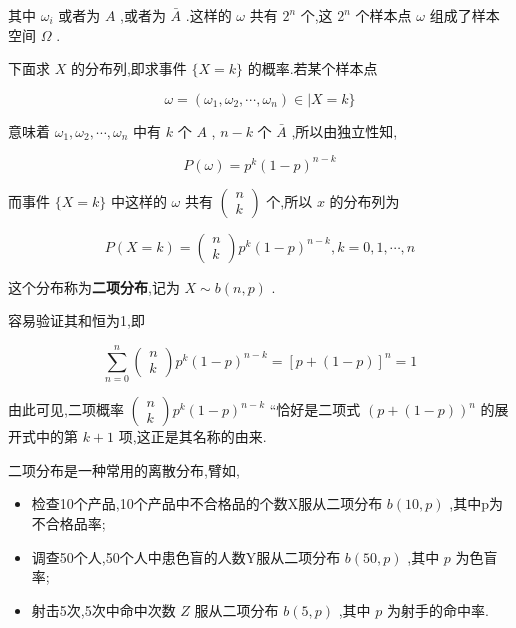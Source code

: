 其中 $ \omega_{i} $ 或者为 $ A $ ,或者为 $ \bar{A} $ .这样的 $ \omega $ 共有 $ 2^{n} $ 个,这 $ 2^{n} $ 个样本点 $ \omega $ 组成了样本空间 $ \Omega $ .

下面求 $ X $ 的分布列,即求事件 $ \{X=k\} $ 的概率.若某个样本点

\[
\omega=\left(\omega_{1}, \omega_{2}, \cdots, \omega_{n}\right) \in | X=k \}
\]

意味着 $ \omega_{1}, \omega_{2}, \cdots, \omega_{n} $ 中有 $ k $ 个 $ A $ , $ n-k $ 个 $ \bar{A} $ ,所以由独立性知,

\[
P(\omega)=p^{k}(1-p)^{n-k}
\]

而事件 $ \{X=k\} $ 中这样的 $ \omega $ 共有 $ \left( \begin{array}{l}{n} \\ {k}\end{array}\right) $ 个,所以 $ x $ 的分布列为

\begin{equation}
P(X=k)=\left( \begin{array}{l}{n} \\ {k}\end{array}\right) p^{k}(1-p)^{n-k}, k=0,1, \cdots, n \label{eq:2.4.1}
\end{equation}


这个分布称为\textbf{二项分布},记为 $ X \sim b(n, p) $ .

容易验证其和恒为1,即

\[
\sum_{n=0}^{n} \left( \begin{array}{l}{n} \\ {k}\end{array}\right) p^{k}(1-p)^{n-k}=[p+(1-p)]^{n}=1
\]

由此可见,二项概率 $ \left( \begin{array}{l}{n} \\ {k}\end{array}\right) p^{k}(1-p)^{n-k} $ “恰好是二项式 $ (p+(1-p))^{n} $ 的展开式中的第 $ k+1 $ 项,这正是其名称的由来.

二项分布是一种常用的离散分布,臂如,

\begin{itemize}
	\item 检查10个产品,10个产品中不合格品的个数X服从二项分布 $ b(10,p) $ ,其中p为不合格品率;
	\item 调查50个人,50个人中患色盲的人数Y服从二项分布 $ b(50,p) $ ,其中 $ p $ 为色盲率;
	\item 射击5次,5次中命中次数 $ Z $ 服从二项分布 $ b(5,p) $ ,其中 $ p $ 为射手的命中率.
\end{itemize}

